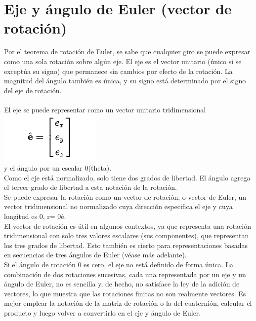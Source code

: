 \documentclass[12pt,a4paper]{article}
\begin{document}
\section{Eje y ángulo de Euler (vector de rotación)}
Por el teorema de rotación de Euler, se sabe que cualquier giro se puede expresar como una sola rotación sobre algún eje. El eje es el vector unitario (único si se exceptúa su signo) que permanece sin cambios por efecto de la rotación. La magnitud del ángulo también es única, y su signo está determinado por el signo del eje de rotación.\\\\
El eje se puede representar como un vector unitario tridimensional\\
\includegraphics[scale=1]{matriz.PNG} \\

y el ángulo por un escalar 0(theta).\\
Como el eje está normalizado, solo tiene dos grados de libertad. El ángulo agrega el tercer grado de libertad a esta notación de la rotación.\\

Se puede expresar la rotación como un vector de rotación, o vector de Euler, un vector tridimensional no normalizado cuya dirección especifica el eje y cuya longitud es 0,  r= 0é.\\
El vector de rotación es útil en algunos contextos, ya que representa una rotación tridimensional con solo tres valores escalares (sus componentes), que representan los tres grados de libertad. Esto también es cierto para representaciones basadas en secuencias de tres ángulos de Euler (véase más adelante).\\

Si el ángulo de rotación 0 es cero, el eje no está definido de forma única. La combinación de dos rotaciones sucesivas, cada una representada por un eje y un ángulo de Euler, no es sencilla y, de hecho, no satisface la ley de la adición de vectores, lo que muestra que las rotaciones finitas no son realmente vectores. Es mejor emplear la notación de la matriz de rotación o la del cuaternión, calcular el producto y luego volver a convertirlo en el eje y ángulo de Euler.\\
\end{document}
